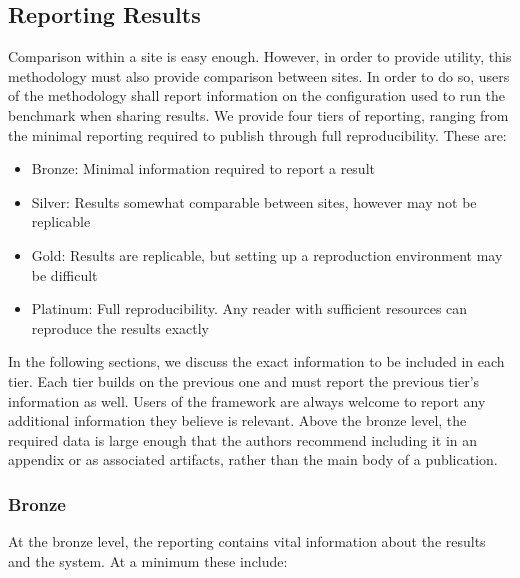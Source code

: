 \documentclass[conference]{IEEEtran}
\begin{document}
\subsection{Reporting Results}

Comparison within a site is easy enough. However, in order to provide utility, 
this methodology must also provide comparison between sites. In order to do so,
users of the methodology shall report information on the configuration used to 
run the benchmark when sharing results. We provide four tiers of reporting, ranging from the 
minimal reporting required to publish through full reproducibility. These are:

\begin{itemize}
    \item Bronze: Minimal information required to report a result
    \item Silver: Results somewhat comparable between sites, however may not be replicable
    \item Gold: Results are replicable, but setting up a reproduction environment may be difficult
    \item Platinum: Full reproducibility. Any reader with sufficient resources can reproduce the results exactly
\end{itemize}

In the following sections, we discuss the exact information to be included in 
each tier. Each tier builds on the previous one and must report the previous tier's 
information as well. Users of the framework are always welcome to report any 
additional information they believe is relevant. Above the bronze level, the 
required data is large enough that the authors recommend including it in an 
appendix or as associated artifacts, rather than the main body of a publication.

\subsubsection{Bronze}

At the bronze level, the reporting contains vital information about the results 
and the system. At a minimum these include:
\end{document}
